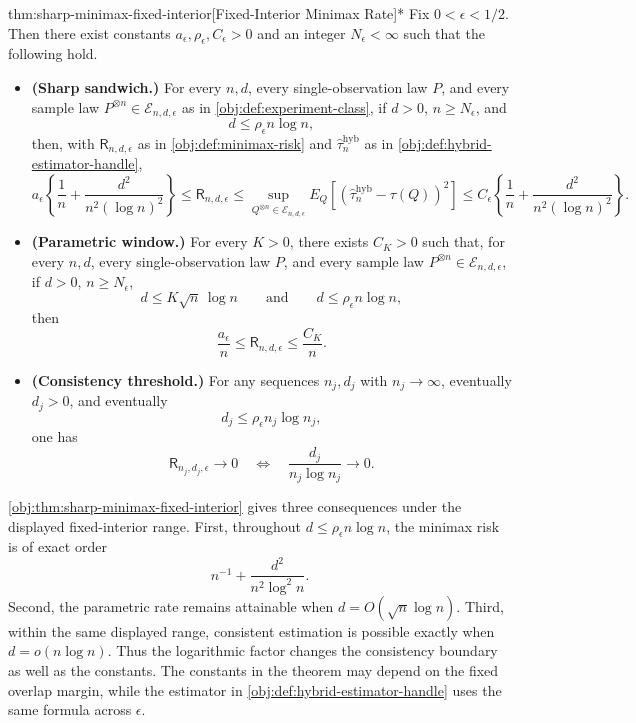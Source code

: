 \begin{theoremv}{thm:sharp-minimax-fixed-interior}[Fixed-Interior Minimax Rate]*
Fix \(0<\epsilon<1/2\). Then there exist constants \(a_\epsilon,\rho_\epsilon,C_\epsilon>0\) and an integer \(N_\epsilon<\infty\) such that the following hold.
\begin{itemize}
\item \textbf{(Sharp sandwich.)} For every \(n,d\), every single-observation law \(P\), and every sample law \(P^{\otimes n}\in\mathcal E_{n,d,\epsilon}\) as in \cref{obj:def:experiment-class}, if \(d>0\), \(n\ge N_\epsilon\), and
\[
d\le \rho_\epsilon n\log n,
\]
then, with \(\mathsf R_{n,d,\epsilon}\) as in \cref{obj:def:minimax-risk} and \(\widehat\tau_n^{\mathrm{hyb}}\) as in \cref{obj:def:hybrid-estimator-handle},
\[
a_\epsilon\left\{\frac1n+\frac{d^2}{n^2(\log n)^2}\right\}
\le
\mathsf R_{n,d,\epsilon}
\le
\sup_{Q^{\otimes n}\in\mathcal E_{n,d,\epsilon}}
E_Q\!\left[\left(\widehat\tau_n^{\mathrm{hyb}}-\tau(Q)\right)^2\right]
\le
C_\epsilon\left\{\frac1n+\frac{d^2}{n^2(\log n)^2}\right\}.
\]
\item \textbf{(Parametric window.)} For every \(K>0\), there exists \(C_K>0\) such that, for every \(n,d\), every single-observation law \(P\), and every sample law \(P^{\otimes n}\in\mathcal E_{n,d,\epsilon}\), if \(d>0\), \(n\ge N_\epsilon\),
\[
d\le K\sqrt n\,\log n
\qquad\text{and}\qquad
d\le \rho_\epsilon n\log n,
\]
then
\[
\frac{a_\epsilon}{n}
\le
\mathsf R_{n,d,\epsilon}
\le
\frac{C_K}{n}.
\]
\item \textbf{(Consistency threshold.)} For any sequences \(n_j,d_j\) with \(n_j\to\infty\), eventually \(d_j>0\), and eventually
\[
d_j\le \rho_\epsilon n_j\log n_j,
\]
one has
\[
\mathsf R_{n_j,d_j,\epsilon}\to0
\quad\Longleftrightarrow\quad
\frac{d_j}{n_j\log n_j}\to0.
\]
\end{itemize}
\end{theoremv}
\cref{obj:thm:sharp-minimax-fixed-interior} gives three consequences under the displayed fixed-interior range. First, throughout \(d\le \rho_\epsilon n\log n\), the minimax risk is of exact order
\[
n^{-1}+\frac{d^2}{n^2\log^2 n}.
\]
Second, the parametric rate remains attainable when \(d=O(\sqrt n\log n)\). Third, within the same displayed range, consistent estimation is possible exactly when \(d=o(n\log n)\). Thus the logarithmic factor changes the consistency boundary as well as the constants. The constants in the theorem may depend on the fixed overlap margin, while the estimator in \cref{obj:def:hybrid-estimator-handle} uses the same formula across \(\epsilon\).

